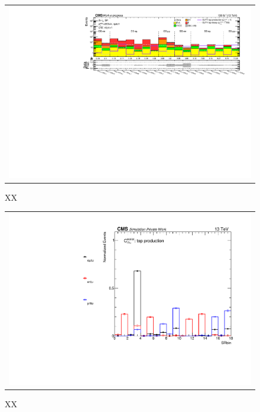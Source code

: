\begin{figure}[tbh!]
 \begin{center}
 \begin{tabular}{c}
 \includegraphics[width=\textwidth]{figures/Part4/Evt/Summary_llOffZMetg20B1}
 \end{tabular}
 \caption{XX}
 \label{fig:Summary}
 \end{center}
 \end{figure}
 
 \begin{figure}[tbh!]
 \begin{center}
 \begin{tabular}{c}
 \includegraphics[width=\textwidth]{figures/Part4/Evt/SRbin}
 \end{tabular}
 \caption{XX}
 \label{fig:SRbin}
 \end{center}
 \end{figure}
 
